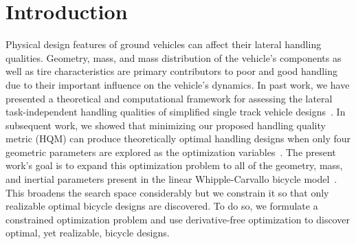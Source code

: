 \documentclass{bmd2019a}
\begin{document}
\section{Introduction}
%
Physical design features of ground vehicles can affect their lateral handling
qualities. Geometry, mass, and mass distribution of the vehicle's components as
well as tire characteristics are primary contributors to poor and good handling
due to their important influence on the vehicle's dynamics. In past work, we
have presented a theoretical and computational framework for assessing the
lateral task-independent handling qualities of simplified single track vehicle
designs~\cite{Hess2012,Moore2012}. In subsequent work, we showed that
minimizing our proposed handling quality metric (HQM) can produce theoretically
optimal handling designs when only four geometric parameters are explored as
the optimization variables~\cite{Moore2016}. The present work's goal is to
expand this optimization problem to all of the geometry, mass, and inertial
parameters present in the linear Whipple-Carvallo bicycle
model~\cite{Meijaard2007}.  This broadens the search space considerably but we
constrain it so that only realizable optimal bicycle designs are discovered. To
do so, we formulate a constrained optimization problem and use derivative-free
optimization to discover optimal, yet realizable, bicycle designs.
\end{document}
